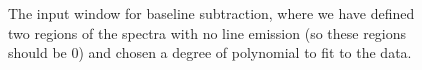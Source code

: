 \documentclass[11pt,a4paper]{article}
\begin{document}
\begin{figure}[h!]
  \centering
  \caption{The input window for baseline subtraction, where we have defined
  two regions of the spectra with no line emission (so these regions should be 0)
  and chosen a degree of polynomial to fit to the data.}
  \label{fig:baseline}
\end{figure}
\end{document}
